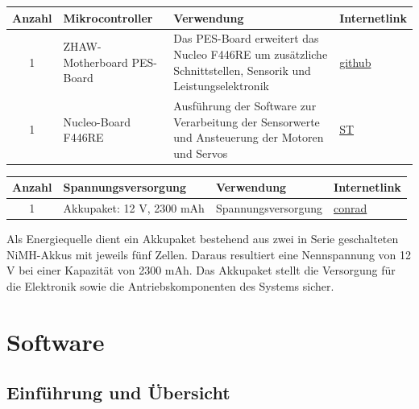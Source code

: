 \documentclass[11pt,a4paper]{article}
\renewcommand{\arraystretch}{1.7}
\begin{document}
	\begin{table}[H]
		\centering
		\renewcommand{\arraystretch}{1.2}
		\begin{tabularx}{\textwidth}{|c|l|X|p{2.5cm}|}
			\hline
			\textbf{Anzahl} & \textbf{Mikrocontroller} & \textbf{Verwendung} & \textbf{Internetlink} 
			\\
			\hline
			1& %
			ZHAW-Motherboard PES-Board& %
			Das PES-Board erweitert das Nucleo F446RE um zusätzliche Schnittstellen, Sensorik und Leistungselektronik& %
			\href{https://github.com/ZHAW-PM-2-ADHS/ADHS}{github} \\
			\hline
			1& %
			Nucleo-Board F446RE& %
			Ausführung der Software zur Verarbeitung der Sensorwerte und Ansteuerung der Motoren und Servos& %
			\href{https://www.st.com/en/evaluation-tools/nucleo-f446re.html}{ST} \\
			\hline
			
		\end{tabularx}
	\end{table}

	\begin{table}[H]
		\centering
		\renewcommand{\arraystretch}{1.2}
		\begin{tabularx}{\textwidth}{|c|l|X|p{2.5cm}|}
			\hline
			\textbf{Anzahl} & \textbf{Spannungsversorgung} & \textbf{Verwendung} & \textbf{Internetlink} 
			\\
			\hline
			1& %
			Akkupaket: 12 V, 2300 mAh& %
			Spannungsversorgung& %
			\href{https://www.conrad.ch/de/p/reely-modellbau-akkupack-nimh-6-v-2300-mah-zellen-zahl-5-mignon-aa-side-by-side-jr-buchse-2613252.html}{conrad} \\
			\hline
			
		\end{tabularx}
	\end{table}
	Als Energiequelle dient ein Akkupaket bestehend aus zwei in Serie geschalteten NiMH-Akkus mit jeweils fünf Zellen. Daraus resultiert eine Nennspannung von 12 V bei einer Kapazität von 2300 mAh. Das Akkupaket stellt die Versorgung für die Elektronik sowie die Antriebskomponenten des Systems sicher.

	
\newpage
	\section{Software}
	
	\subsection{Einführung und Übersicht}
	
\end{document}
